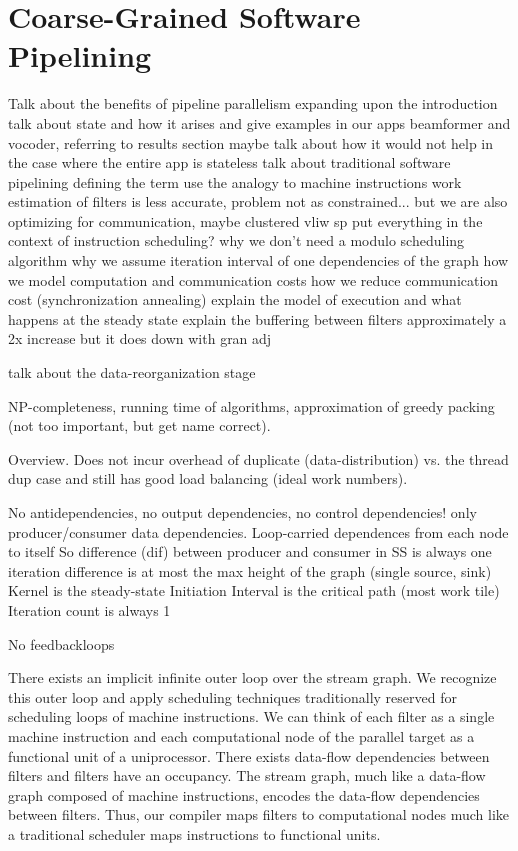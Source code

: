 \section{Coarse-Grained Software Pipelining} 

Talk about the benefits of pipeline parallelism
  expanding upon the introduction
  talk about state and how it arises and give examples in our apps
     beamformer and vocoder, referring to results section
  maybe talk about how it would not help in the case where the entire
     app is stateless
  talk about traditional software pipelining defining the term
  use the analogy to machine instructions
     work estimation of filters is less accurate, problem not as 
             constrained...
     but we are also optimizing for communication, maybe clustered
             vliw sp
  put everything in the context of instruction scheduling?
  why we don't need a modulo scheduling algorithm
  why we assume iteration interval of one
  dependencies of the graph
  how we model computation and communication costs
  how we reduce communication cost (synchronization annealing)
  explain the model of execution and what happens at the steady state
  explain the buffering between filters
	approximately a 2x increase but it does down with gran adj
  
talk about the data-reorganization stage

NP-completeness, running time of algorithms, approximation of greedy
packing (not too important, but get name correct).

Overview.
Does not incur overhead of duplicate (data-distribution) vs. the
thread dup case and still has good load balancing (ideal work numbers).


No antidependencies, no output dependencies, no control dependencies!
only producer/consumer data dependencies.
Loop-carried dependences from each node to itself
So difference (dif) between producer and consumer in SS is always one
iteration difference is at most the max height of the graph 
(single source, sink)
Kernel is the steady-state
Initiation Interval is the critical path (most work tile)
Iteration count is always 1

No feedbackloops


There exists an implicit infinite outer loop over the stream graph. We
recognize this outer loop and apply scheduling techniques
traditionally reserved for scheduling loops of machine
instructions. We can think of each filter as a single machine
instruction and each computational node of the parallel target as a
functional unit of a uniprocessor. There exists data-flow dependencies
between filters and filters have an occupancy.  The stream graph, much
like a data-flow graph composed of machine instructions, encodes the
data-flow dependencies between filters. Thus, our compiler maps
filters to computational nodes much like a traditional scheduler maps
instructions to functional units.

